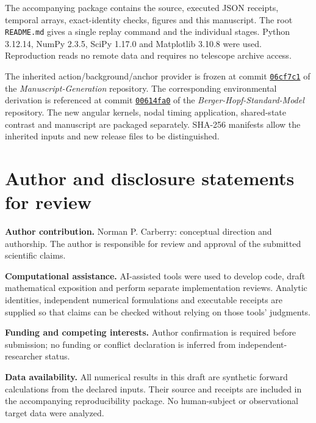 \documentclass[11pt,a4paper]{article}
\begin{document}
The accompanying package contains the source, executed JSON receipts,
temporal arrays, exact-identity checks, figures and this manuscript.
The root \texttt{README.md} gives a single replay command and the
individual stages. Python 3.12.14, NumPy 2.3.5, SciPy 1.17.0 and
Matplotlib 3.10.8 were used. Reproduction reads no remote data and
requires no telescope archive access.

The inherited action/background/anchor provider is frozen at commit
\href{https://github.com/ncarberry64/Manuscript-Generation/commit/06cf7c1b85d6605bfee0cc0d07fb2af86a66cae9}{\texttt{06cf7c1}} of the
\emph{Manuscript-Generation} repository. The corresponding environmental
derivation is referenced at commit
\href{https://github.com/ncarberry64/Berger-Hopf-Standard-Model/commit/00614fa0d479a2de78460ca061cc5304cdb610cf}{\texttt{00614fa0}} of the
\emph{Berger-Hopf-Standard-Model} repository. The new angular kernels,
nodal timing application, shared-state contrast and manuscript are
packaged separately. SHA-256 manifests allow the inherited inputs and
new release files to be distinguished.

\section*{Author and disclosure statements for review}

\noindent\textbf{Author contribution.} Norman P. Carberry: conceptual
direction and authorship. The author is responsible for review and
approval of the submitted scientific claims.

\noindent\textbf{Computational assistance.} AI-assisted tools were used
to develop code, draft mathematical exposition and perform separate
implementation reviews. Analytic identities, independent numerical
formulations and executable receipts are supplied so that claims can
be checked without relying on those tools' judgments.

\noindent\textbf{Funding and competing interests.} Author confirmation
is required before submission; no funding or conflict declaration is
inferred from independent-researcher status.

\noindent\textbf{Data availability.} All numerical results in this draft
are synthetic forward calculations from the declared inputs. Their
source and receipts are included in the accompanying reproducibility
package. No human-subject or observational target data were analyzed.

\begingroup
{}


\endgroup
\end{document}
